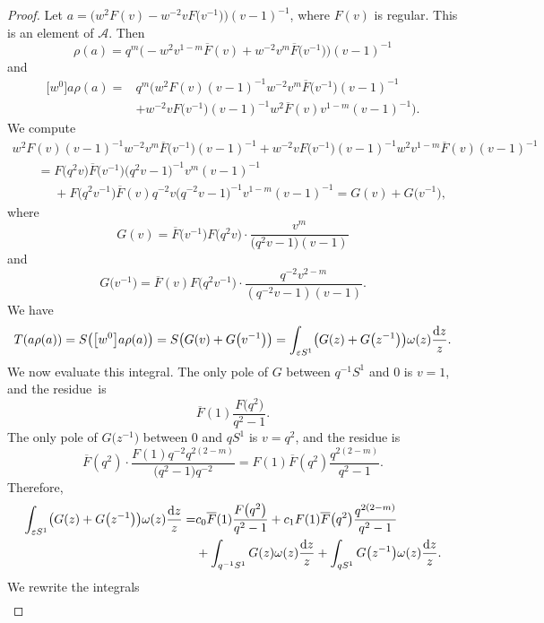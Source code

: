 \documentclass[pdftex]{sigma}
\newcommand\eps{\varepsilon}
\newcommand{\mc}{\mathcal}
\newcommand{\ovl}{\overline}
\numberwithin{equation}{section}
\theoremstyle{definition}
\begin{document}
\begin{proof}
 Let $a=\bigl(w^2F(v)-w^{-2}vF\bigl(v^{-1}\bigr)\bigr)(v-1)^{-1}$, where $F(v)$ is regular. This is an element of $\mc{A}$. Then \[\rho(a)=q^m\bigl(-w^2v^{1-m}\overline{F}(v)+w^{-2}v^{m}\overline{F}\bigl(v^{-1}\bigr)\bigr)(v-1)^{-1}\] and
 \begin{align*}
 \big[w^0\big]a\rho(a)={}&q^m\bigl(w^2F(v)(v-1)^{-1}w^{-2}v^m\overline{F}\bigl(v^{-1}\bigr)(v-1)^{-1}\\
 &+w^{-2}vF\bigl(v^{-1}\bigr)(v-1)^{-1}w^2\ovl{F}(v)v^{1-m}(v-1)^{-1}\bigr).
 \end{align*}
 We compute
 \begin{gather*}
 w^2F(v)(v-1)^{-1}w^{-2}v^m\ovl{F}\bigl(v^{-1}\bigr)(v-1)^{-1}+w^{-2}vF\bigl(v^{-1}\bigr)(v-1)^{-1}w^2v^{1-m}\ovl{F}(v)(v-1)^{-1}\\
\qquad= F\bigl(q^2v\bigr)\ovl{F}\bigl(v^{-1}\bigr)\bigl(q^2v-1\bigr)^{-1}v^m(v-1)^{-1}\\
\phantom{\qquad=}{}+F\bigl(q^{2}v^{-1}\bigr)\ovl{F}(v)q^{-2}v\bigl(q^{-2}v-1\bigr)^{-1}v^{1-m}(v-1)^{-1}=G(v)+G\bigl(v^{-1}\bigr),
 \end{gather*}
 where
 \[G(v)=\ovl{F}\bigl(v^{-1}\bigr)F\bigl(q^2v\bigr)\cdot\frac{v^m}{\bigl(q^2v-1\bigr)(v-1)}\]
 and
 \[G\bigl(v^{-1}\bigr)=\ovl{F}(v)F\bigl(q^2 v^{-1}\bigr)\cdot \frac{q^{-2}v^{2-m}}{(q^{-2}v-1)(v-1)}.\]
 We have
 \begin{equation}
 \label{EqTaRhoaAsIntegral}
 T(a\rho(a))=S\bigl(\big[w^0\big]a\rho(a)\bigr)=S\bigl(G(v)+G\bigl(v^{-1}\bigr)\bigr)=\int_{\eps S^1} \bigl(G(z)+G\bigl(z^{-1}\bigr)\bigr)\omega(z)\frac{{\rm d}z}{z}.
 \end{equation}
 We now evaluate this integral.
 The only pole of $G$ between $q^{-1}S^1$ and $0$ is $v=1$, and the residue~is
 \[\ovl{F}(1)\frac{F\bigl(q^2\bigr)}{q^2-1}.\]
 The only pole of $G\bigl(z^{-1}\bigr)$ between $0$ and $qS^1$ is $v=q^2$, and the residue is
\[\ovl{F}(q^{2})\cdot\frac{F(1)q^{-2}q^{2(2-m)}}{\bigl(q^2-1\bigr)q^{-2}}=F(1)\ovl{F}(q^{2})\frac{q^{2(2-m)}}{q^2-1}.\]
Therefore,
 \begin{align}
\int_{\eps S^1} \bigl(G(z)+G\bigl(z^{-1}\bigr)\bigr)\omega(z)\frac{{\rm d}z}{z}=&c_0\ovl{F}(1)\frac{F\bigl(q^2\bigr)}{q^2-1}+c_1F(1)\ovl{F}\bigl(q^{2}\bigr)\frac{q^{2(2-m)}}{q^2-1}\nonumber\\
&+\int_{q^{-1}S^1}G(z)\omega(z)\frac{{\rm d}z}{z}+\int_{qS^1}G\bigl(z^{-1}\bigr)\omega(z)\frac{{\rm d}z}{z} . \label{EqIntegralAsResiduePlusSymmetricG}
\end{align}
We rewrite the integrals
 \begin{align*}

\end{align*}
\end{proof}
\end{document}

